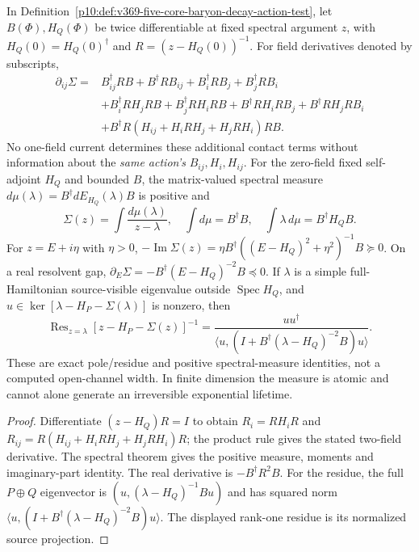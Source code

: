 \documentclass[12pt,a4paper]{article}
\begin{document}
\begin{proposition}
\label{p10:prop:v374-schur-twojet-and-spectral-measure}
In Definition~\ref{p10:def:v369-five-core-baryon-decay-action-test},
let $B(\Phi),H_Q(\Phi)$ be twice differentiable at fixed spectral
argument $z$, with $H_Q(0)=H_Q(0)^\dagger$ and
$R=(z-H_Q(0))^{-1}$. For field derivatives denoted by subscripts,
\[
\begin{aligned}
\partial_{ij}\Sigma={}& B_{ij}^\dagger RB+B^\dagger RB_{ij}
 +B_i^\dagger RB_j+B_j^\dagger RB_i\\
&+B_i^\dagger RH_jRB+B_j^\dagger RH_iRB
 +B^\dagger RH_iRB_j+B^\dagger RH_jRB_i\\
&+B^\dagger R(H_{ij}+H_iRH_j+H_jRH_i)RB.
\end{aligned}
\]
No one-field current determines these additional contact terms
without information about the \emph{same action's} $B_{ij},H_i,H_{ij}$.
For the zero-field fixed self-adjoint $H_Q$ and bounded $B$, the
matrix-valued spectral measure $d\mu(\lambda)=
B^\dagger dE_{H_Q}(\lambda)B$ is positive and
\[
 \boxed{\Sigma(z)=\int\frac{d\mu(\lambda)}{z-\lambda},\quad
 \int d\mu=B^\dagger B,\quad
 \int\lambda\,d\mu=B^\dagger H_QB.}
\]
For $z=E+i\eta$ with $\eta>0$,
$-\operatorname{Im}\Sigma(z)=
\eta B^\dagger((E-H_Q)^2+\eta^2)^{-1}B\succeq0$.
On a real resolvent gap,
$\partial_E\Sigma=-B^\dagger(E-H_Q)^{-2}B\preceq0$.
If $\lambda$ is a simple full-Hamiltonian source-visible eigenvalue
outside $\operatorname{Spec}H_Q$, and
$u\in\ker[\lambda-H_P-\Sigma(\lambda)]$ is nonzero, then
\[
 \boxed{\operatorname{Res}_{z=\lambda}
  [z-H_P-\Sigma(z)]^{-1}
 =\frac{uu^\dagger}
 {\langle u,(I+B^\dagger(\lambda-H_Q)^{-2}B)u\rangle}.}
\]
These are exact pole/residue and positive spectral-measure identities,
not a computed open-channel width. In finite dimension the measure is
atomic and cannot alone generate an irreversible exponential lifetime.
\end{proposition}
\begin{proof}
Differentiate $(z-H_Q)R=I$ to obtain
$R_i=RH_iR$ and
$R_{ij}=R(H_{ij}+H_iRH_j+H_jRH_i)R$; the product rule gives the
stated two-field derivative. The spectral theorem gives the positive
measure, moments and imaginary-part identity. The real derivative is
$-B^\dagger R^2B$. For the residue, the full $P\oplus Q$
eigenvector is $(u,(\lambda-H_Q)^{-1}Bu)$ and has squared norm
$\langle u,(I+B^\dagger(\lambda-H_Q)^{-2}B)u\rangle$.
The displayed rank-one residue is its normalized source projection.
\end{proof}
\end{document}
